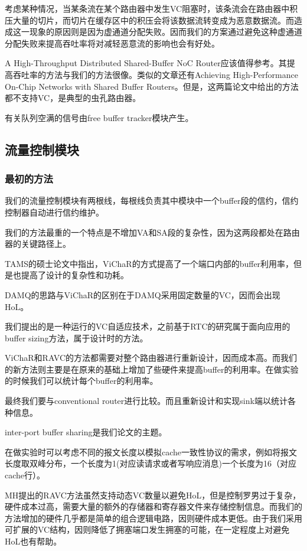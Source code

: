\documentclass[10pt,journal]{IEEEtran}
\begin{document}
考虑某种情况，当某条流在某个路由器中发生VC阻塞时，该条流会在路由器中积压大量的切片，而切片在缓存区中的积压会将该数据流转变成为恶意数据流。而造成这一现象的原因则是因为虚通道分配失败。因而我们的方案通过避免这种虚通道分配失败来提高吞吐率将对减轻恶意流的影响也会有好处。

A High-Throughput Distributed Shared-Buffer NoC Router应该值得参考。其提高吞吐率的方法与我们的方法很像。类似的文章还有Achieving High-Performance On-Chip Networks with Shared Buffer Routers。但是，这两篇论文中给出的方法都不支持VC，是典型的虫孔路由器。


有关队列空满的信号由free buffer tracker模块产生。

\subsection{流量控制模块}
\subsubsection{最初的方法}
我们的流量控制模块有两根线，每根线负责其中模块中一个buffer段的信约，信约控制器自动进行信约维护。

我们的方法最重的一个特点是不增加VA和SA段的复杂性，因为这两段都处在路由器的关键路径上。

TAMS的硕士论文中指出，ViChaR的方式提高了一个端口内部的buffer利用率，但是也提高了设计的复杂性和功耗。

DAMQ的思路与ViChaR的区别在于DAMQ采用固定数量的VC，因而会出现HoL。

我们提出的是一种运行的VC自适应技术，之前基于RTC的研究属于面向应用的buffer sizing方法，属于设计时的方法。

ViChaR和RAVC的方法都需要对整个路由器进行重新设计，因而成本高。而我们的新方法则主要是在原来的基础上增加了些硬件来提高buffer的利用率。在做实验的时候我们可以统计每个buffer的利用率。

最终我们要与conventional router进行比较。而且重新设计和实现sink端以统计各种信息。

inter-port buffer sharing是我们论文的主题。

在做实验时可以考虑不同的报文长度以模拟cache一致性协议的需求，例如将报文长度取双峰分布，一个长度为1(对应读请求或者写响应消息)一个长度为16（对应cache行）。

MH提出的RAVC方法虽然支持动态VC数量以避免HoL，但是控制罗男过于复杂，硬件成本过高，需要大量的额外的存储器和寄存器文件来存储控制信息。而我们的方法增加的硬件几乎都是简单的组合逻辑电路，因则硬件成本更低。由于我们采用可扩展的VC结构，因则降低了拥塞端口发生拥塞的可能，在一定程度上对避免HoL也有帮助。
\end{document}

